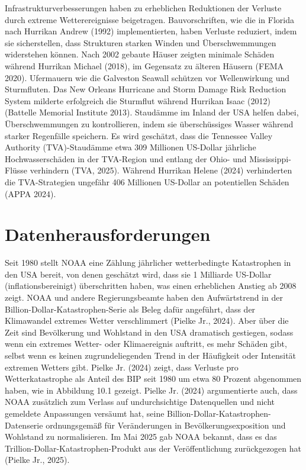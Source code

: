 \documentclass[12pt,paper=a4,DIV=12,parskip=never,chapterprefix=false,headings=standardclasses]{scrreprt}
\begin{document}
Infrastrukturverbesserungen haben zu erheblichen Reduktionen der Verluste durch extreme Wetterereignisse beigetragen. Bauvorschriften, wie die in Florida nach Hurrikan Andrew (1992) implementierten, haben Verluste reduziert, indem sie sicherstellen, dass Strukturen starken Winden und Überschwemmungen widerstehen können. Nach 2002 gebaute Häuser zeigten minimale Schäden während Hurrikan Michael (2018), im Gegensatz zu älteren Häusern (FEMA 2020). Ufermauern wie die Galveston Seawall schützen vor Wellenwirkung und Sturmfluten. Das New Orleans Hurricane and Storm Damage Risk Reduction System milderte erfolgreich die Sturmflut während Hurrikan Isaac (2012) (Battelle Memorial Institute 2013). Staudämme im Inland der USA helfen dabei, Überschwemmungen zu kontrollieren, indem sie überschüssiges Wasser während starker Regenfälle speichern. Es wird geschätzt, dass die Tennessee Valley Authority (TVA)-Staudämme etwa 309 Millionen US-Dollar jährliche Hochwasserschäden in der TVA-Region und entlang der Ohio- und Mississippi-Flüsse verhindern (TVA, 2025). Während Hurrikan Helene (2024) verhinderten die TVA-Strategien ungefähr 406 Millionen US-Dollar an potentiellen Schäden (APPA 2024).

\section{Datenherausforderungen}
Seit 1980 stellt NOAA eine Zählung jährlicher wetterbedingte Katastrophen in den USA bereit, von denen geschätzt wird, dass sie 1 Milliarde US-Dollar (inflationsbereinigt) überschritten haben, was einen erheblichen Anstieg ab 2008 zeigt. NOAA und andere Regierungsbeamte haben den Aufwärtstrend in der Billion-Dollar-Katastrophen-Serie als Beleg dafür angeführt, dass der Klimawandel extremes Wetter verschlimmert (Pielke Jr., 2024). Aber über die Zeit sind Bevölkerung und Wohlstand in den USA dramatisch gestiegen, sodass wenn ein extremes Wetter- oder Klimaereignis auftritt, es mehr Schäden gibt, selbst wenn es keinen zugrundeliegenden Trend in der Häufigkeit oder Intensität extremen Wetters gibt. Pielke Jr. (2024) zeigt, dass Verluste pro Wetterkatastrophe als Anteil des BIP seit 1980 um etwa 80 Prozent abgenommen haben, wie in Abbildung 10.1 gezeigt. Pielke Jr. (2024) argumentierte auch, dass NOAA zusätzlich zum Verlass auf undurchsichtige Datenquellen und nicht gemeldete Anpassungen versäumt hat, seine Billion-Dollar-Katastrophen-Datenserie ordnungsgemäß für Veränderungen in Bevölkerungsexposition und Wohlstand zu normalisieren. Im Mai 2025 gab NOAA bekannt, dass es das Trillion-Dollar-Katastrophen-Produkt aus der Veröffentlichung zurückgezogen hat (Pielke Jr., 2025).
\end{document}
